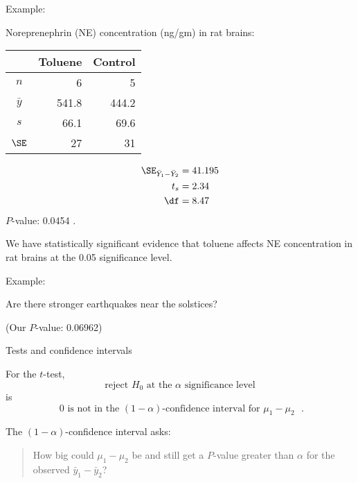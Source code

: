 \begin{frame}{Example: }

    Noreprenephrin (NE) concentration (ng/gm) in rat brains:
    \begin{center}
      \begin{tabular}{c|rr}
            & Toluene & Control \\
          \hline
          $n$ & 6 & 5 \\
          $\bar y$ & 541.8 & 444.2 \\
          $s$  & 66.1 & 69.6 \\
          $\SE$ & 27 & 31 \\
     \end{tabular}
   \end{center}


     \begin{align*}
         \SE_{\bar Y_1 - \bar Y_2} &= 41.195 \\
         t_s &= 2.34  \\
         \df &= 8.47 
     \end{align*}
     $P$-value: 0.0454 .


  \vspace{2em}

  We have statistically significant evidence that toluene affects NE concentration in rat brains at the 0.05 significance level.
  \pause

\end{frame}

\begin{frame}{Example: }

  Are there stronger earthquakes near the solstices?

  \vspace{2em}

  (Our $P$-value: 0.06962)

\end{frame}


\begin{frame}{Tests and confidence intervals}

  For the $t$-test,
  \[  \text{reject $H_0$ at the $\alpha$ significance level} \]
  is 
  \[  \text{ 0 is not in the $(1-\alpha)$-confidence interval for $\mu_1-\mu_2$ }. \]


  \vspace{2em}


  The $(1-\alpha)$-confidence interval asks: 
  \begin{quote}
    How big could $\mu_1-\mu_2$ be and still get a $P$-value greater than $\alpha$ for the observed $\bar y_1 - \bar y_2$?
  \end{quote}


\end{frame}


